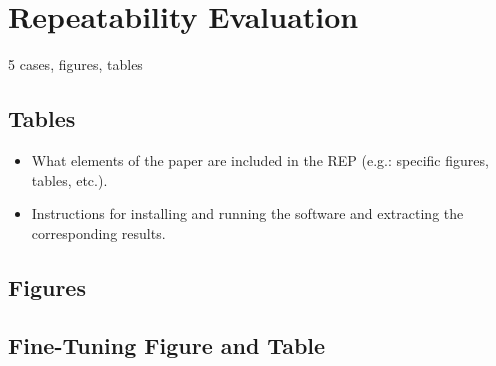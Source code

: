 \documentclass{llncs}
\begin{document}

\section{Repeatability Evaluation}

5 cases, figures, tables

\subsection{Tables}

\begin{itemize}
    \item What elements of the paper are included in the REP (e.g.: specific figures, tables, etc.).
    \item Instructions for installing and running the software and extracting the corresponding results. 
\end{itemize}

\subsection{Figures}

\subsection{Fine-Tuning Figure and Table}




\end{document}
